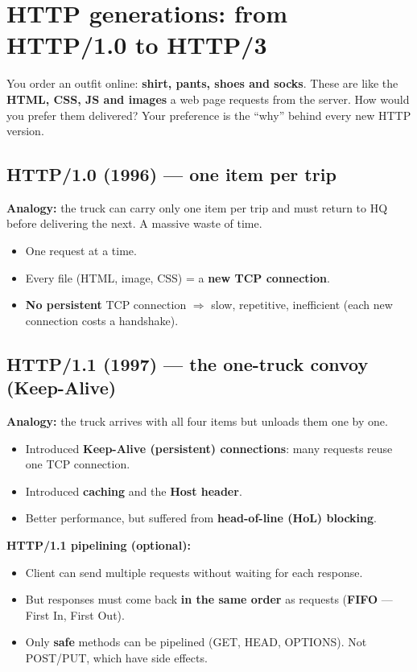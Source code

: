 \section{HTTP generations: from HTTP/1.0 to HTTP/3}

\begin{analogy}
You order an outfit online: \textbf{shirt, pants, shoes and socks}. These are like the \textbf{HTML, CSS, JS and images} a web page requests from the server. How would you prefer them delivered? Your preference is the ``why'' behind every new HTTP version.
\end{analogy}

\subsection{HTTP/1.0 (1996) --- one item per trip}
\textbf{Analogy:} the truck can carry only one item per trip and must return to HQ before delivering the next. A massive waste of time.
\begin{itemize}
  \item One request at a time.
  \item Every file (HTML, image, CSS) = a \textbf{new TCP connection}.
  \item \textbf{No persistent} TCP connection $\Rightarrow$ slow, repetitive, inefficient (each new connection costs a handshake).
\end{itemize}

\subsection{HTTP/1.1 (1997) --- the one-truck convoy (Keep-Alive)}
\textbf{Analogy:} the truck arrives with all four items but unloads them one by one.
\begin{itemize}
  \item Introduced \textbf{Keep-Alive (persistent) connections}: many requests reuse one TCP connection.
  \item Introduced \textbf{caching} and the \textbf{Host header}.
  \item Better performance, but suffered from \textbf{head-of-line (HoL) blocking}.
\end{itemize}

\textbf{HTTP/1.1 pipelining (optional):}
\begin{itemize}
  \item Client can send multiple requests without waiting for each response.
  \item But responses must come back \textbf{in the same order} as requests (\textbf{FIFO} --- First In, First Out).
  \item Only \textbf{safe} methods can be pipelined (GET, HEAD, OPTIONS). Not POST/PUT, which have side effects.
\end{itemize}

